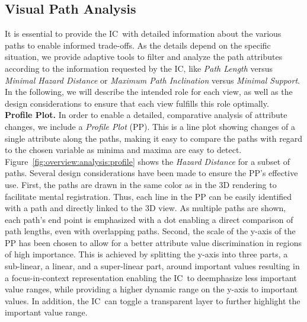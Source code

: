 \documentclass[conference,10pt,letter]{IEEEtran}
\def\IC{IC}
\begin{document}
\subsection{Visual Path Analysis} \label{sec:overview:pathanalysis}
It is essential to provide the \IC\ with detailed information about the various paths to enable informed trade-offs. As the details depend on the specific situation, we provide adaptive tools to filter and analyze the path attributes according to the information requested by the \IC , like \emph{Path Length} versus \emph{Minimal Hazard Distance} or \emph{Maximum Path Inclination} versus \emph{Minimal Support}. In the following, we will describe the intended role for each view, as well as the design considerations to ensure that each view fulfills this role optimally.\\
%
\noindent \textbf{Profile Plot.} In order to enable a detailed, comparative analysis of attribute changes, we include a \emph{Profile Plot} (PP). This is a line plot showing changes of a single attribute along the paths, making it easy to compare the paths with regard to the chosen variable as minima and maxima are easy to detect. Figure~\ref{fig:overview:analysis:profile} shows the \emph{Hazard Distance} for a subset of paths. Several design considerations have been made to ensure the PP's effective use. First, the paths are drawn in the same color as in the 3D rendering to facilitate mental registration. Thus, each line in the PP can be easily identified with a path and directly linked to the 3D view. As multiple paths are shown, each path's end point is emphasized with a dot enabling a direct comparison of path lengths, even with overlapping paths. Second, the scale of the y-axis of the PP has been chosen to allow for a better attribute value discrimination in regions of high importance. This is achieved by splitting the y-axis into three parts, a sub-linear, a linear, and a super-linear part, around important values resulting in a focus-in-context representation enabling the \IC\ to deemphasize less important value ranges, while providing a higher dynamic range on the y-axis to important values. In addition, the \IC\ can toggle a transparent layer to further highlight the important value range. \\
%
\end{document}
